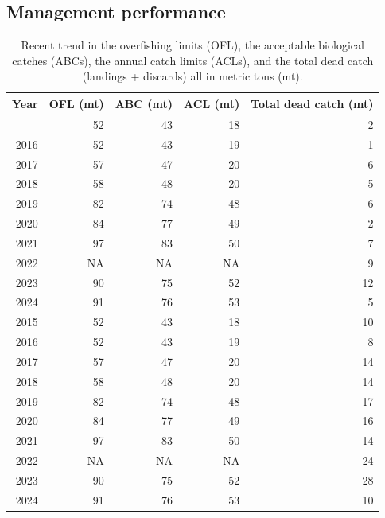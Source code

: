 \documentclass[
]{scrartcl}
\begin{document}
\endgroup

\clearpage

\subsection*{Management performance}\label{management-performance}

\begingroup
\fontsize{9.0pt}{10.8pt}\selectfont

\begin{longtable}{rrrrr}

\caption{\label{tbl-es-management}Recent trend in the overfishing limits
(OFL), the acceptable biological catches (ABCs), the annual catch limits
(ACLs), and the total dead catch (landings + discards) all in metric
tons (mt).}

\tabularnewline

\toprule
Year & OFL (mt) & ABC (mt) & ACL (mt) & Total dead catch (mt) \\ 
\midrule\addlinespace[2.5pt]
2015 & 52 & 43 & 18 & 2 \\ 
2016 & 52 & 43 & 19 & 1 \\ 
2017 & 57 & 47 & 20 & 6 \\ 
2018 & 58 & 48 & 20 & 5 \\ 
2019 & 82 & 74 & 48 & 6 \\ 
2020 & 84 & 77 & 49 & 2 \\ 
2021 & 97 & 83 & 50 & 7 \\ 
2022 & NA & NA & NA & 9 \\ 
2023 & 90 & 75 & 52 & 12 \\ 
2024 & 91 & 76 & 53 & 5 \\ 
2015 & 52 & 43 & 18 & 10 \\ 
2016 & 52 & 43 & 19 & 8 \\ 
2017 & 57 & 47 & 20 & 14 \\ 
2018 & 58 & 48 & 20 & 14 \\ 
2019 & 82 & 74 & 48 & 17 \\ 
2020 & 84 & 77 & 49 & 16 \\ 
2021 & 97 & 83 & 50 & 14 \\ 
2022 & NA & NA & NA & 24 \\ 
2023 & 90 & 75 & 52 & 28 \\ 
2024 & 91 & 76 & 53 & 10 \\ 
\bottomrule

\end{longtable}
\end{document}
